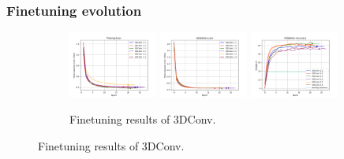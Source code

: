 \documentclass{beamer}
\begin{document}
\begin{frame}
    \frametitle{Finetuning evolution}
    \begin{figure}[htbp]
        \centering
         \begin{subfigure}[b]{\textwidth}
             \centering
             \includegraphics[width=0.32\textwidth]{../report/entities/finetuned/baseline/train_losses.png}
             \includegraphics[width=0.32\textwidth]{../report/entities/finetuned/baseline/val_losses.png}
             \includegraphics[width=0.32\textwidth]{../report/entities/finetuned/baseline/val_accs.png}
             \caption{Finetuning results of 3DConv.}
         \end{subfigure}
        \hfill
    

\end{figure}
\end{frame}
\end{document}
